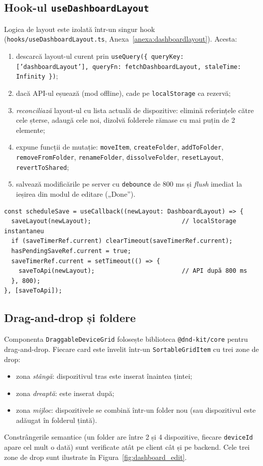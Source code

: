 \subsection{Hook-ul \texttt{useDashboardLayout}}
Logica de layout este izolată într-un singur hook (\texttt{hooks/useDashboardLayout.ts}, Anexa~\ref{anexa:dashboardlayout}). Acesta:
\begin{enumerate}
    \item descarcă layout-ul curent prin \texttt{useQuery(\{ queryKey: ['dashboardLayout'], queryFn: fetchDashboardLayout, staleTime: Infinity \})};
    \item dacă API-ul eșuează (mod offline), cade pe \texttt{localStorage} ca rezervă;
    \item \textit{reconciliază} layout-ul cu lista actuală de dispozitive: elimină referințele către cele șterse, adaugă cele noi, dizolvă folderele rămase cu mai puțin de 2 elemente;
    \item expune funcții de mutație: \texttt{moveItem}, \texttt{createFolder}, \texttt{addToFolder}, \texttt{removeFromFolder}, \texttt{renameFolder}, \texttt{dissolveFolder}, \texttt{resetLayout}, \texttt{revertToShared};
    \item salvează modificările pe server cu \texttt{debounce} de 800 ms și \textit{flush} imediat la ieșirea din modul de editare („Done”).
\end{enumerate}

\begin{verbatim}
const scheduleSave = useCallback((newLayout: DashboardLayout) => {
  saveLayout(newLayout);                         // localStorage instantaneu
  if (saveTimerRef.current) clearTimeout(saveTimerRef.current);
  hasPendingSaveRef.current = true;
  saveTimerRef.current = setTimeout(() => {
    saveToApi(newLayout);                        // API după 800 ms
  }, 800);
}, [saveToApi]);
\end{verbatim}

\subsection{Drag-and-drop și foldere}
Componenta \texttt{DraggableDeviceGrid} folosește biblioteca \texttt{@dnd-kit/core} pentru drag-and-drop. Fiecare card este învelit într-un \texttt{SortableGridItem} cu trei zone de drop:
\begin{itemize}
    \item zona \emph{stângă}: dispozitivul tras este inserat înaintea țintei;
    \item zona \emph{dreaptă}: este inserat după;
    \item zona \emph{mijloc}: dispozitivele se combină într-un folder nou (sau dispozitivul este adăugat în folderul țintă).
\end{itemize}
Constrângerile semantice (un folder are între 2 și 4 dispozitive, fiecare \texttt{deviceId} apare cel mult o dată) sunt verificate atât pe client cât și pe backend. Cele trei zone de drop sunt ilustrate în Figura~\ref{fig:dashboard_edit}.

